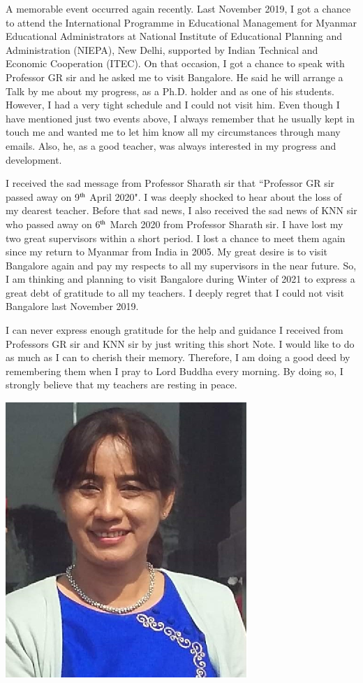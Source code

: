A memorable event occurred again recently. Last November 2019, I got a chance to attend the International Programme in Educational Management for Myanmar Educational Administrators at National Institute of Educational Planning and Administration (NIEPA), New Delhi, supported by Indian Technical and Economic Cooperation (ITEC). On that occasion, I got a chance to speak with Professor GR sir and he asked me to visit Bangalore. He said he will arrange a Talk by me about my progress, as a Ph.D. holder and as one of his students. However, I had a very tight schedule and I could not visit him. Even though I have mentioned just two events above, I always remember that he usually kept in touch me and wanted me to let him know all my circumstances through many emails. Also, he, as a good teacher, was always interested in my progress and development. 

I received the sad message from Professor Sharath sir that ``Professor GR sir passed away on 9$^{\rm th}$ April 2020". I was deeply shocked to hear about the loss of my dearest teacher. Before that sad news, I also received the sad news of KNN sir who passed away on 6$^{\rm th}$ March 2020 from Professor Sharath sir. I have lost my two great supervisors within a short period. I lost a chance to meet them again since my return to Myanmar from India in 2005. My great desire is to visit Bangalore again and pay my respects to all my supervisors in the near future. So, I am thinking and planning to visit Bangalore during Winter of 2021 to express a great debt of gratitude to all my teachers. I deeply regret that I could not visit Bangalore last November 2019. 

I can never express enough gratitude for the help and guidance I received from Professors GR sir and KNN sir by just writing this short Note. I would like to do as much as I can to cherish their memory. Therefore, I am doing a good deed by remembering them when I pray to Lord Buddha every morning. By doing so, I strongly believe that my teachers are resting in peace. 
\vspace{1cm}

\centerline{\includegraphics[scale=.8]{authorsphotos/YeeYeeOo.eps}}
\medskip

